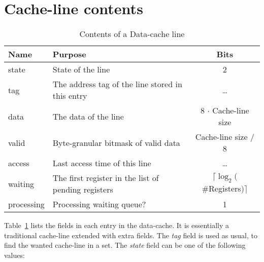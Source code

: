 \section{Cache-line contents}
\begin{table}
\begin{center}
\begin{tabular}{|l|l|c|}
\hline
Name & Purpose & Bits \\
\hline
\hline
state & State of the line & 2 \\
tag & The address tag of the line stored in this entry & \ldots \\
data & The data of the line & 8 $\cdot$ Cache-line size \\
valid & Byte-granular bitmask of valid data & Cache-line size / 8 \\
access & Last access time of this line & \ldots \\
waiting & The first register in the list of pending registers & $\lceil \log_2($\#Registers$) \rceil$ \\
processing & Processing waiting queue? & 1 \\
\hline
\end{tabular}
\caption{Contents of a Data-cache line}
\label{table:dcache_contents}
\end{center}
\end{table}

Table~\ref{table:dcache_contents} lists the fields in each entry in the data-cache. It is essentially a traditional cache-line extended with extra fields.
The \emph{tag} field is used as usual, to find the wanted cache-line in a set. The \emph{state} field can be one of the following values:

